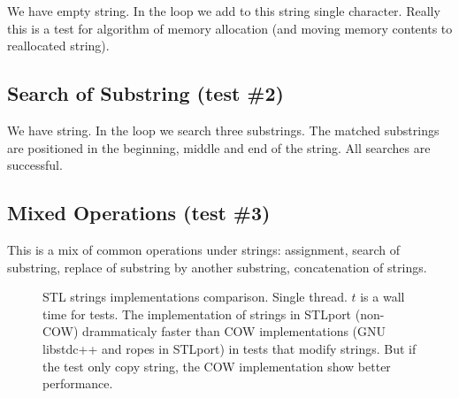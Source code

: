 \documentclass[a4paper]{article}
\providecommand{\STLport}{{\fontfamily{cmss}\selectfont STLport}}
\providecommand{\libstd}{{\fontfamily{cmtt}\selectfont GNU \mbox{libstdc++}}}
\begin{document}
We have empty string. In the loop we add to this string single
character.
Really this is a test for algorithm
of memory allocation (and moving memory contents to reallocated string).



\subsection{Search of Substring\label{search-string} (test \#2)}

We have string. In the loop we search three substrings.
The matched substrings are positioned in
the beginning, middle and end of the string. All searches are
successful.



\subsection{Mixed Operations\label{mixed-string} (test \#3)}

This is a mix of common operations under strings: assignment,
search of substring, replace of substring by another substring,
concatenation of strings.



\begin{figure}
  \begin{center}
    
  \end{center}
  \caption{STL strings implementations comparison. Single thread. $t$ is a wall time
           for tests.
           The implementation of strings in \STLport{} (non-COW)
           drammaticaly faster than COW implementations (\libstd{} and
           ropes in \STLport{}) in tests that modify strings.
           But if the test only copy string, the COW implementation show better
           performance.
           \label{STLport-gpp-strings}}
\end{figure}

%    
\end{document}
